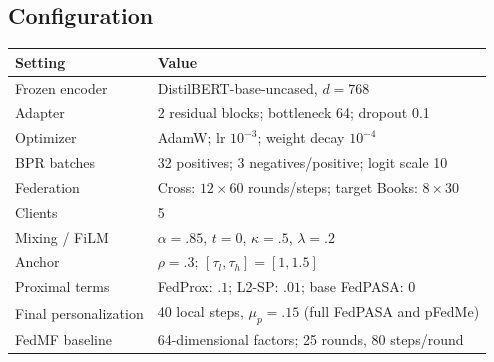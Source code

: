 \subsection{Configuration}
\label{app:hyper}
\par\addvspace{3pt}\noindent\begin{minipage}{\columnwidth}\centering\footnotesize
{}
\label{tab:hyper}
\setlength{\tabcolsep}{3pt}
\begin{tabularx}{\columnwidth}{@{}p{}X@{}}
\toprule
Setting & Value \\
\midrule
Frozen encoder & DistilBERT-base-uncased, $d=768$ \\
Adapter & 2 residual blocks; bottleneck 64; dropout 0.1 \\
Optimizer & AdamW; lr $10^{-3}$; weight decay $10^{-4}$ \\
BPR batches & 32 positives; 3 negatives/positive; logit scale 10 \\
Federation & Cross: $12\times60$ rounds/steps; target Books: $8\times30$ \\
Clients & 5 \\
Mixing / FiLM & $\alpha=.85$, $t=0$, $\kappa=.5$, $\lambda=.2$ \\
Anchor & $\rho=.3$; $[\tau_l,\tau_h]=[1,1.5]$ \\
Proximal terms & FedProx: $.1$; L2-SP: $.01$; base FedPASA: $0$ \\
Final personalization & 40 local steps, $\mu_p=.15$ (full FedPASA and pFedMe) \\
FedMF baseline & 64-dimensional factors; 25 rounds, 80 steps/round \\
\bottomrule
\end{tabularx}
\end{minipage}\par\addvspace{3pt}


